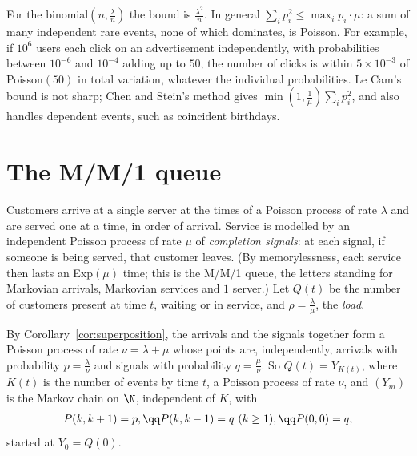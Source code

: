 For the binomial$(n,\frac\lambda n)$ the bound is $\frac{\lambda^2}n$. In general $\sum_ip_i^2\le\max_ip_i\cdot\mu$: a sum of many independent rare events, none of which
dominates, is Poisson. For example, if $10^6$ users each click on an advertisement independently, with probabilities
between $10^{-6}$ and $10^{-4}$ adding up to $50$, the number of clicks is within $5\times10^{-3}$ of Poisson$(50)$ in total variation, whatever the
individual probabilities. Le Cam's bound is not sharp; Chen and Stein's method gives $\min(1,\frac1\mu)\sum_ip_i^2$, and also handles
dependent events, such as coincident birthdays.

\section{The M/M/1 queue}

Customers arrive at a single server at the times of a Poisson process of rate $\lambda$ and are served one at a time, in order
of arrival. Service is modelled by an independent Poisson process of rate $\mu$ of \emph{completion signals}: at each signal, if
someone is being served, that customer leaves. (By memorylessness, each service then lasts an Exp$(\mu)$ time; this is the
M/M/1 queue, the letters standing for Markovian arrivals, Markovian services and $1$ server.) Let $Q(t)$ be the number of
customers present at time $t$, waiting or in service, and $\rho=\frac\lambda\mu$, the \emph{load}.

By Corollary~\ref{cor:superposition}, the arrivals and the signals together form a Poisson process of rate $\nu=\lambda+\mu$ whose points are,
independently, arrivals with probability $p=\frac\lambda\nu$ and signals with probability $q=\frac\mu\nu$. So $Q(t)=Y_{K(t)}$, where $K(t)$ is the number of
events by time $t$, a Poisson process of rate $\nu$, and $(Y_m)$ is the Markov chain on $\N$, independent of $K$, with
\[
\begin{gathered}P(k,k+1)=p,\qq P(k,k-1)=q\ (k\ge1),\qq P(0,0)=q,\end{gathered}
\]
started at $Y_0=Q(0)$.

